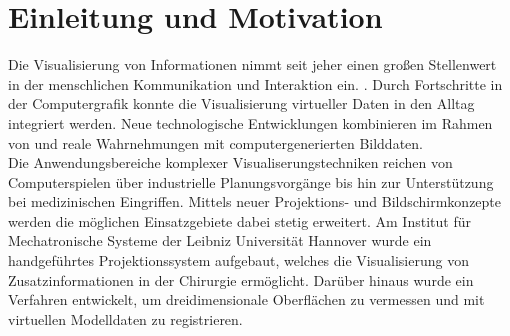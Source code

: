 \chapter{Einleitung und Motivation}

\prever{
}

Die Visualisierung von Informationen nimmt seit jeher einen großen Stellenwert in der menschlichen Kommunikation und Interaktion ein. . Durch Fortschritte in der Computergrafik konnte die Visualisierung virtueller Daten in den Alltag integriert werden. Neue technologische Entwicklungen kombinieren im Rahmen von \red[Virtueller] und  reale Wahrnehmungen mit computergenerierten Bilddaten.\\

Die Anwendungsbereiche komplexer Visualiserungstechniken reichen von Computerspielen über industrielle Planungsvorgänge bis hin zur Unterstützung bei medizinischen Eingriffen. Mittels neuer Projektions- und Bildschirmkonzepte werden die möglichen Einsatzgebiete dabei stetig erweitert. Am Institut für Mechatronische Systeme der Leibniz Universität Hannover wurde ein handgeführtes Projektionssystem aufgebaut, welches die Visualisierung von Zusatzinformationen in der Chirurgie ermöglicht. Darüber hinaus wurde ein Verfahren entwickelt, um dreidimensionale Oberflächen zu vermessen und mit virtuellen Modelldaten zu registrieren.\\

